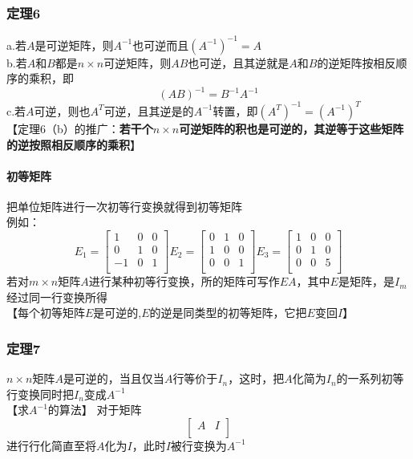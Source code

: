 \documentclass{article}
\begin{document}
\begin{CJK}{UTF8}{gkai}
\subsubsection{定理6}
a.若$A$是可逆矩阵，则$A^{-1}$也可逆而且$(A^{-1})^{-1}=A $\\
b.若$A$和$B$都是$n\times n$可逆矩阵，则$AB$也可逆，且其逆就是$A$和$B$的逆矩阵按相反顺序的乘积，即
\[(AB)^{-1}=B^{-1}A^{-1}\]
c.若$A$可逆，则也$A^T$可逆，且其逆是的$A^{-1}$转置，即$(A^T)^{-1}=(A^{-1})^T$\\
【定理6（b）的推广：\textbf{若干个$n\times n$可逆矩阵的积也是可逆的，其逆等于这些矩阵的逆按照相反顺序的乘积}】\\
\paragraph{初等矩阵\\}
把单位矩阵进行一次初等行变换就得到初等矩阵\\
例如：
\[E_1=\begin{bmatrix}
    1&0&0\\
    0&1&0\\
    -1&0&1\\
\end{bmatrix}
    E_2=\begin{bmatrix}
        0&1&0\\
        1&0&0\\
        0&0&1\\
    \end{bmatrix}
    E_3=
        \begin{bmatrix}
            1&0&0\\
            0&1&0\\
            0&0&5\\
    \end{bmatrix}
\]
若对$m\times n$矩阵$A$进行某种初等行变换，所的矩阵可写作$EA$，其中$E$是矩阵，是$I_m$经过同一行变换所得\\
【每个初等矩阵$E$是可逆的,$E$的逆是同类型的初等矩阵，它把$E$变回$I$】\\
\subsubsection{定理7}
$n\times n$矩阵$A$是可逆的，当且仅当$A$行等价于$I_n$，这时，把$A$化简为$I_n$的一系列初等行变换同时把$I_n$变成$A^{-1}$\\
【求$A^{-1}$的算法】
对于矩阵\[\begin{bmatrix}
A&I\\    
\end{bmatrix}\]
进行行化简直至将$A$化为$I$，此时$I$被行变换为$A^{-1}$

\end{CJK}
\end{document}
